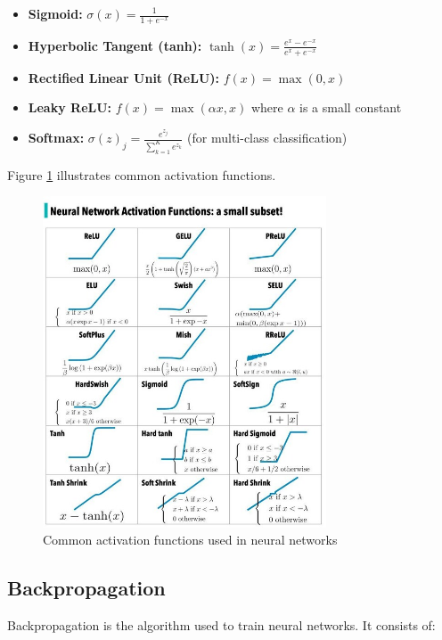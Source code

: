 \documentclass[11pt,a4paper]{report}
\begin{document}
\begin{itemize}
    \item \textbf{Sigmoid:} $\sigma(x) = \frac{1}{1 + e^{-x}}$
    \item \textbf{Hyperbolic Tangent (tanh):} $\tanh(x) = \frac{e^x - e^{-x}}{e^x + e^{-x}}$
    \item \textbf{Rectified Linear Unit (ReLU):} $f(x) = \max(0, x)$
    \item \textbf{Leaky ReLU:} $f(x) = \max(\alpha x, x)$ where $\alpha$ is a small constant
    \item \textbf{Softmax:} $\sigma(z)_j = \frac{e^{z_j}}{\sum_{k=1}^{K} e^{z_k}}$ (for multi-class classification)
\end{itemize}

Figure \ref{fig:activation-functions} illustrates common activation functions.

\begin{figure}[ht]
    \centering
    \includegraphics[width=0.75\textwidth]{activation_functions.jpg}
    \caption{Common activation functions used in neural networks}
    \label{fig:activation-functions}
\end{figure}

\subsection{Backpropagation}
Backpropagation is the algorithm used to train neural networks. It consists of:
\end{document}
